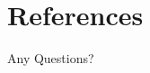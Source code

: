 \documentclass[serif, aspectratio=169]{beamer}
\begin{document}


\section{References}

\begin{frame}[allowframebreaks]
    
    
    \nocite{*} %
\end{frame}


\begin{frame}
    \begin{center}
        {\Huge Any Questions?}
    \end{center}
\end{frame}
\end{document}
